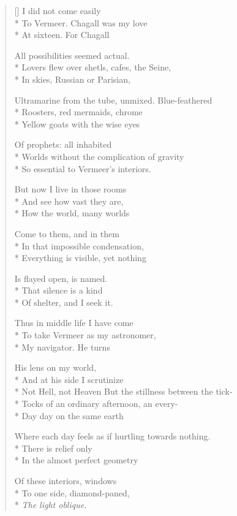 \label{ch:camera_obscura}
\settowidth{\versewidth}{Where each day feels as if hurtling towards nothing.}
\begin{verse}[\versewidth]
I did not come easily\\*
To Vermeer.  Chagall was my love\\*
At sixteen. For Chagall

All possibilities seemed actual.\\*
Lovers flew over shetls, cafes, the Seine,\\*
In skies, Russian or Parisian,

Ultramarine from the tube, unmixed.  Blue-feathered\\*
Roosters, red mermaids, chrome\\*
Yellow goats with the wise eyes

Of prophets: all inhabited\\*
Worlds without the complication of gravity\\*
So essential to Vermeer's interiors.

But now I live in those rooms\\*
And see how vast they are,\\*
How the world, many worlds

Come to them, and in them\\*
In that impossible condensation,\\*
Everything is visible, yet nothing

Is flayed open, is named. \\*
That silence is a kind \\*
Of shelter, and I seek it.

Thus in middle life I have come\\*
To take Vermeer as my astronomer,\\*
My navigator.   He turns

His lens on my world,\\*
And at his side I scrutinize\\*
Not Hell, not Heaven
But the stillness between the tick-\\*
Tocks of an ordinary afternoon, an every-\\*
Day day on the same earth

Where each day feels as if hurtling towards nothing.\\*
There is relief only\\*
In the almost perfect geometry

Of these interiors, windows\\*
To one side, diamond-paned,\\*
\textit{The light oblique.}
\end{verse}
